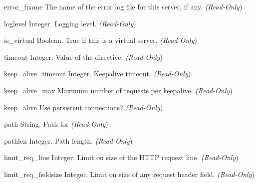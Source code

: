 \begin{memberdesc}[server]{error_fname}
  The name of the error log file for this server, if any.
  \emph{(Read-Only})
\end{memberdesc}

\begin{memberdesc}[server]{loglevel}
  Integer. Logging level.
  \emph{(Read-Only})
\end{memberdesc}

\begin{memberdesc}[server]{is_virtual}
  Boolean. True if this is a virtual server.
  \emph{(Read-Only})
\end{memberdesc}

\begin{memberdesc}[server]{timeout}
  Integer. Value of the  directive.
  \emph{(Read-Only})
\end{memberdesc}

\begin{memberdesc}[server]{keep_alive_timeout}
  Integer. Keepalive timeout.
  \emph{(Read-Only})
\end{memberdesc}

\begin{memberdesc}[server]{keep_alive_max}
  Maximum number of requests per keepalive.
  \emph{(Read-Only})
\end{memberdesc}

\begin{memberdesc}[server]{keep_alive}
  Use persistent connections?
  \emph{(Read-Only})
\end{memberdesc}

\begin{memberdesc}[server]{path}
  String. Path for 
  \emph{(Read-Only})
\end{memberdesc}

\begin{memberdesc}[server]{pathlen}
  Integer. Path length.
  \emph{(Read-Only})
\end{memberdesc}

\begin{memberdesc}[server]{limit_req_line}
  Integer. Limit on size of the HTTP request line.
  \emph{(Read-Only})
\end{memberdesc}

\begin{memberdesc}[server]{limit_req_fieldsize}
  Integer. Limit on size of any request header field.
  \emph{(Read-Only})
\end{memberdesc}

